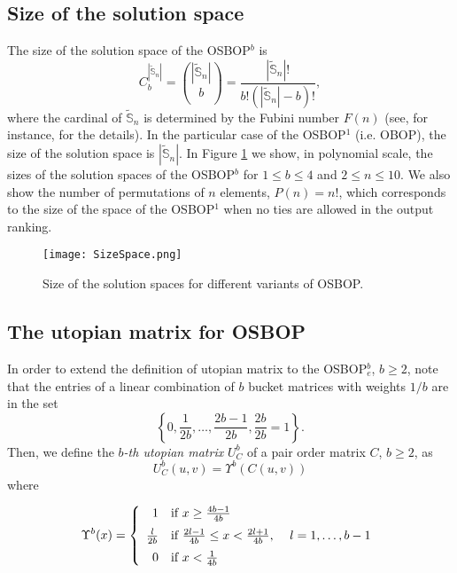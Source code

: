 \documentclass[preprint,12pt]{article}
\theoremstyle{definition}
\theoremstyle{remark}
\theoremstyle{example} %
\begin{document}
\subsection{Size of the solution space}

The size of the solution space of the OSBOP$^b$ is 
\[
C^{|\widetilde{\mathbb{S}}_n|}_b=\binom{|\widetilde{\mathbb{S}}_n|}{b} =\frac{|\widetilde{\mathbb{S}}_n| !}{ b! (|\widetilde{\mathbb{S}}_n|-b)! },
\]
where the cardinal of $\widetilde{\mathbb{S}}_n$ is determined by the Fubini number $F(n)$ (see, for instance, \cite[Section 3]{Aledo2018-ES-EJOR} for the details). 
In the particular case of the OSBOP$^1$ (i.e. OBOP), the size of the solution space is $|\widetilde{\mathbb{S}}_n|$. In Figure \ref{fig:SizeSpace} we show, in polynomial scale, the sizes of the solution spaces of the OSBOP$^b$ for $1\leq b \leq 4$ and $2\leq n\leq 10$. 
We also show the number of permutations of $n$ elements, $P(n)=n!$, which corresponds to the size of the space of the OSBOP$^1$ when no ties are allowed in the output ranking. 






\begin{figure}[htbp]
\centering
\texttt{[image: SizeSpace.png]}
\caption{\label{fig:SizeSpace}Size of the solution spaces for different variants of OSBOP.}
\end{figure}






\subsection{The utopian matrix for OSBOP}\label{utopian matrix OSBOP}


In order to extend the definition of utopian matrix to the OSBOP$_e^b$, $b\geq 2$, note that the entries of a linear combination of $b$ bucket matrices with weights $1/b$ are in the set
\[
\left\{0, \frac{1}{2b}, \dots, \frac{2b-1}{2b}, \frac{2b}{2b}=1 \right\}.
\]
Then, we define the \emph{$b$-th utopian matrix} $U_C^b$ of a pair order matrix $C$, $b\geq 2$, as
\[
U_C^b(u,v)=\Upsilon^b(C(u,v))
\]
where


\[
\Upsilon^b(x)=\left\{
\begin{array}{rl}
1 & \mbox{if $x\geq\frac{4b-1}{4b}$} \\ [2mm]
\frac{l}{2b} & \mbox{if $\frac{2l-1}{4b}\leq x< \frac{2l+1}{4b}$, \quad $l=1,\dots,b-1$} \\ [2mm]
0 & \mbox{if $x<\frac{1}{4b}$}
\end{array} \right.
\]
\end{document}

